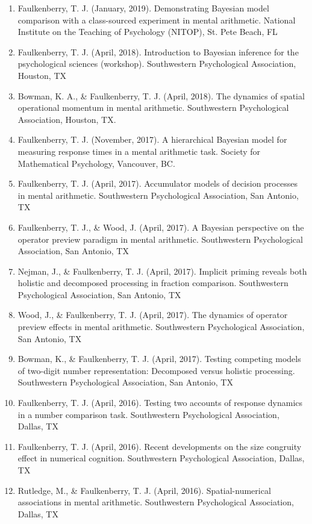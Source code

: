 \documentclass[article,10pt]{article}
\begin{document}
\begin{enumerate}
\item Faulkenberry, T. J. (January, 2019). Demonstrating Bayesian model comparison with a class-sourced experiment in mental arithmetic. National Institute on the Teaching of Psychology (NITOP), St. Pete Beach, FL
\item Faulkenberry, T. J. (April, 2018). Introduction to Bayesian inference for the psychological sciences (workshop). Southwestern Psychological Association, Houston, TX
\item Bowman, K. A., \& Faulkenberry, T. J. (April, 2018). The dynamics of spatial operational momentum in mental arithmetic. Southwestern Psychological Association, Houston, TX.
\item Faulkenberry, T. J. (November, 2017). A hierarchical Bayesian model for measuring response times in a mental arithmetic task. Society for Mathematical Psychology, Vancouver, BC.
\item Faulkenberry, T. J. (April, 2017). Accumulator models of decision processes in mental arithmetic. Southwestern Psychological Association, San Antonio, TX
\item Faulkenberry, T. J., \& Wood, J. (April, 2017). A Bayesian perspective on the operator preview paradigm in mental arithmetic. Southwestern Psychological Association, San Antonio, TX
\item Nejman, J., \& Faulkenberry, T. J. (April, 2017). Implicit priming reveals both holistic and decomposed processing in fraction comparison. Southwestern Psychological Association, San Antonio, TX
\item Wood, J., \& Faulkenberry, T. J. (April, 2017). The dynamics of operator preview effects in mental arithmetic. Southwestern Psychological Association, San Antonio, TX
\item Bowman, K., \& Faulkenberry, T. J. (April, 2017). Testing competing models of two-digit number representation: Decomposed versus holistic processing. Southwestern Psychological Association, San Antonio, TX
\item Faulkenberry, T. J. (April, 2016). Testing two accounts of response dynamics in a number comparison task. Southwestern Psychological Association, Dallas, TX
\item Faulkenberry, T. J. (April, 2016). Recent developments on the size congruity effect in numerical cognition. Southwestern Psychological Association, Dallas, TX
\item Rutledge, M., \& Faulkenberry, T. J. (April, 2016). Spatial-numerical associations in mental arithmetic. Southwestern Psychological Association, Dallas, TX

\end{enumerate}
\end{document}
